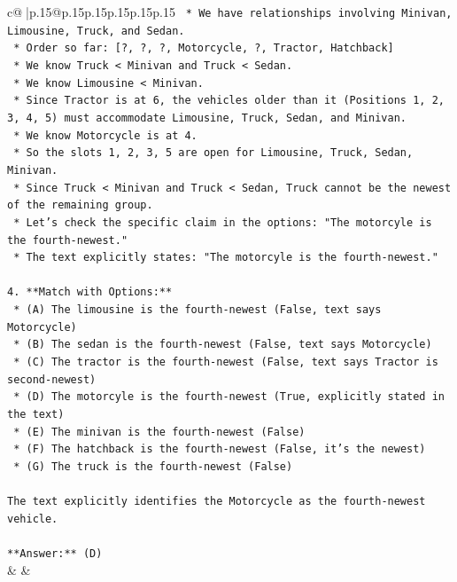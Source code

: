 \documentclass{article}
\begin{document}
{\begin{supertabular}{c@{$\;$}|p{.15\linewidth}@{}p{.15\linewidth}p{.15\linewidth}p{.15\linewidth}p{.15\linewidth}p{.15\linewidth}}
{{{\texttt{    *   We have relationships involving Minivan, Limousine, Truck, and Sedan.} \\
\texttt{        *   Order so far: {[}?, ?, ?, Motorcycle, ?, Tractor, Hatchback{]}} \\
\texttt{        *   We know Truck < Minivan and Truck < Sedan.} \\
\texttt{        *   We know Limousine < Minivan.} \\
\texttt{        *   Since Tractor is at 6, the vehicles older than it (Positions 1, 2, 3, 4, 5) must accommodate Limousine, Truck, Sedan, and Minivan.} \\
\texttt{        *   We know Motorcycle is at 4.} \\
\texttt{        *   So the slots 1, 2, 3, 5 are open for Limousine, Truck, Sedan, Minivan.} \\
\texttt{        *   Since Truck < Minivan and Truck < Sedan, Truck cannot be the newest of the remaining group.} \\
\texttt{        *   Let's check the specific claim in the options: "The motorcyle is the fourth{-}newest."} \\
\texttt{        *   The text explicitly states: "The motorcyle is the fourth{-}newest."} \\
\\ 
\texttt{4.  **Match with Options:**} \\
\texttt{    *   (A) The limousine is the fourth{-}newest (False, text says Motorcycle)} \\
\texttt{    *   (B) The sedan is the fourth{-}newest (False, text says Motorcycle)} \\
\texttt{    *   (C) The tractor is the fourth{-}newest (False, text says Tractor is second{-}newest)} \\
\texttt{    *   (D) The motorcyle is the fourth{-}newest (True, explicitly stated in the text)} \\
\texttt{    *   (E) The minivan is the fourth{-}newest (False)} \\
\texttt{    *   (F) The hatchback is the fourth{-}newest (False, it's the newest)} \\
\texttt{    *   (G) The truck is the fourth{-}newest (False)} \\
\\ 
\texttt{The text explicitly identifies the Motorcycle as the fourth{-}newest vehicle.} \\
\\ 
\texttt{**Answer:** (D)} \\
            }
        }
    }
    & & \\ \\


\end{supertabular}}
\end{document}
